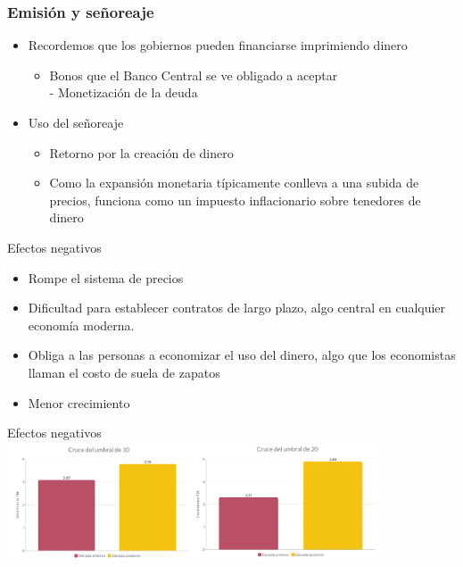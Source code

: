 \documentclass{beamer}
\begin{document}
\begin{frame}
\frametitle{Emisión y señoreaje}
\begin{itemize}
    \item Recordemos que los gobiernos pueden financiarse imprimiendo dinero
        \begin{itemize}
        \item Bonos que el Banco Central se ve obligado a aceptar \\
        - Monetización de la deuda
        \end{itemize}
    \vspace{2mm}
    \item Uso del señoreaje
\begin{itemize}
        \item Retorno por la creación de dinero
        \item Como la expansión monetaria típicamente conlleva a una subida de precios, funciona como un impuesto inflacionario sobre tenedores de dinero 
        \end{itemize}
\end{itemize}
\end{frame}

\begin{frame}{Efectos negativos}
    \begin{itemize}
 \item Rompe el sistema de precios
 \item Dificultad para establecer contratos de largo plazo, algo central en cualquier economía moderna.
 \item  Obliga a las personas a economizar el uso del dinero,
algo que los economistas llaman el costo de suela de zapatos
\item Menor crecimiento
  \end{itemize}
\end{frame}

\begin{frame}{Efectos negativos}
\centering\includegraphics[width=11cm]{../Figures/38.11.pdf}\
\end{frame}
\end{document}
